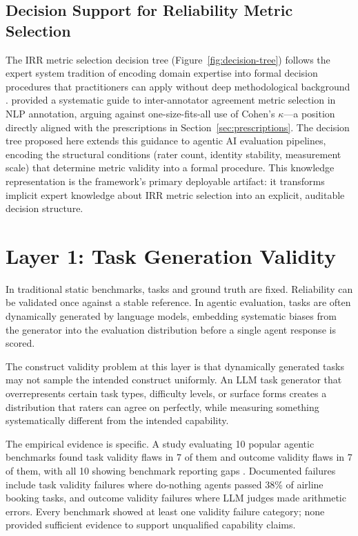 \documentclass[preprint,12pt]{elsarticle}
\begin{document}
\subsection{Decision Support for Reliability Metric Selection}

The IRR metric selection decision tree (Figure~\ref{fig:decision-tree}) follows the
expert system tradition of encoding domain expertise into formal decision procedures
that practitioners can apply without deep methodological background
\citep{krippendorff2004}. \citet{james2026} provided a systematic guide to
inter-annotator agreement metric selection in NLP annotation, arguing against
one-size-fits-all use of Cohen's $\kappa$---a position directly aligned with the
prescriptions in Section~\ref{sec:prescriptions}. The decision tree proposed here
extends this guidance to agentic AI evaluation pipelines, encoding the structural
conditions (rater count, identity stability, measurement scale) that determine metric
validity into a formal procedure. This knowledge representation is the framework's
primary deployable artifact: it transforms implicit expert knowledge about IRR metric
selection into an explicit, auditable decision structure.

\section{Layer 1: Task Generation Validity}
\label{sec:layer1}

In traditional static benchmarks, tasks and ground truth are fixed. Reliability can
be validated once against a stable reference. In agentic evaluation, tasks are often
dynamically generated by language models, embedding systematic biases from the
generator into the evaluation distribution before a single agent response is scored.

The construct validity problem at this layer is that dynamically generated tasks may
not sample the intended construct uniformly. An LLM task generator that
overrepresents certain task types, difficulty levels, or surface forms creates a
distribution that raters can agree on perfectly, while measuring something
systematically different from the intended capability.

The empirical evidence is specific. A study evaluating 10 popular agentic benchmarks
found task validity flaws in 7 of them and outcome validity flaws in 7 of them, with
all 10 showing benchmark reporting gaps \citep{zhu2025}. Documented failures include
task validity failures where do-nothing agents passed 38\% of airline booking tasks,
and outcome validity failures where LLM judges made arithmetic errors. Every benchmark
showed at least one validity failure category; none provided sufficient evidence to
support unqualified capability claims.
\end{document}
